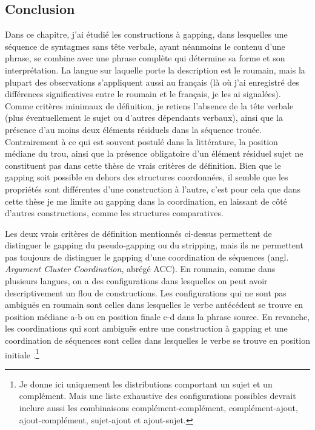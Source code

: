\subsection{Conclusion}
Dans ce chapitre, j'ai étudié les constructions à gapping, dans lesquelles une séquence de syntagmes sans tête verbale, ayant néanmoins le contenu d'une phrase, se combine avec une phrase complète qui détermine sa forme et son interprétation. La langue sur laquelle porte la description est le roumain, mais la plupart des observations s'appliquent aussi au français (là où j'ai enregistré des différences significatives entre le roumain et le français, je les ai signalées). Comme critères minimaux de définition, je retiens l'absence de la tête verbale (plus éventuellement le sujet ou d'autres dépendants verbaux), ainsi que la présence d'au moins deux éléments résiduels dans la séquence trouée. Contrairement à ce qui est souvent postulé dans la littérature, la position médiane du trou, ainsi que la présence obligatoire d'un élément résiduel sujet ne constituent pas dans cette thèse de vrais critères de définition. Bien que le gapping soit possible en dehors des structures coordonnées, il semble que les propriétés sont différentes d'une construction à l'autre, c'est pour cela que dans cette thèse je me limite au gapping dans la coordination, en laissant de côté d'autres constructions, comme les structures comparatives.

Les deux vrais critères de définition mentionnés ci-dessus permettent de distinguer le gapping du pseudo-gapping ou du stripping, mais ils ne permettent pas toujours de distinguer le gapping d'une coordination de séquences (angl. \textit{Argument Cluster Coordination}, abrégé ACC). En roumain, comme dans plusieurs langues, on a des configurations dans lesquelles on peut avoir descriptivement un flou de constructions. Les configurations qui ne sont pas ambiguës en roumain sont celles dans lesquelles le verbe antécédent se trouve en position médiane a-b ou en position finale c-d dans la phrase source. En revanche, les coordinations qui sont ambiguës entre une construction à gapping et une coordination de séquences sont celles dans lesquelles le verbe se trouve en position initiale .\footnote{Je donne ici uniquement les distributions comportant un sujet et un complément. Mais une liste exhaustive des configurations possibles devrait inclure aussi les combinaisons complément-complément, complément-ajout, ajout-complément, sujet-ajout et ajout-sujet.} 


